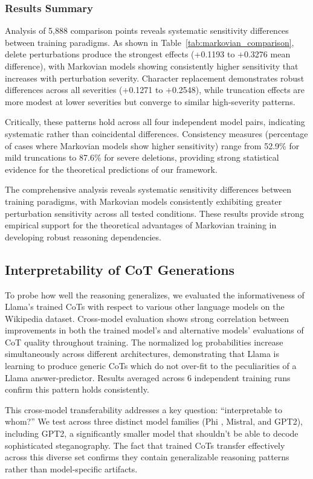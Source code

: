 \documentclass[letterpaper]{article} %
\begin{document}
\subsubsection{Results Summary}
Analysis of 5,888 comparison points reveals systematic sensitivity differences between training paradigms. As shown in Table~\ref{tab:markovian_comparison}, delete perturbations produce the strongest effects (+0.1193 to +0.3276 mean difference), with Markovian models showing consistently higher sensitivity that increases with perturbation severity. Character replacement demonstrates robust differences across all severities (+0.1271 to +0.2548), while truncation effects are more modest at lower severities but converge to similar high-severity patterns.

Critically, these patterns hold across all four independent model pairs, indicating systematic rather than coincidental differences. Consistency measures (percentage of cases where Markovian models show higher sensitivity) range from 52.9\% for mild truncations to 87.6\% for severe deletions, providing strong statistical evidence for the theoretical predictions of our framework.

The comprehensive analysis reveals systematic sensitivity differences between training paradigms, with Markovian models consistently exhibiting greater perturbation sensitivity across all tested conditions. These results provide strong empirical support for the theoretical advantages of Markovian training in developing robust reasoning dependencies.

\subsection{Interpretability of CoT Generations}
\label{subsec:interp}

To probe how well the reasoning generalizes, we evaluated the informativeness of Llama's trained CoTs with respect to various other language models on the Wikipedia dataset. Cross-model evaluation shows strong correlation between improvements in both the trained model's and alternative models' evaluations of CoT quality throughout training. The normalized log probabilities increase simultaneously across different architectures, demonstrating that Llama is learning to produce generic CoTs which do not over-fit to the peculiarities of a Llama answer-predictor. Results averaged across 6 independent training runs confirm this pattern holds consistently. 

This cross-model transferability addresses a key question: ``interpretable to whom?'' We test across three distinct model families (Phi \citep{abdin2024phi3technicalreporthighly}, Mistral, and GPT2), including GPT2, a significantly smaller model that shouldn't be able to decode sophisticated steganography. The fact that trained CoTs transfer effectively across this diverse set confirms they contain generalizable reasoning patterns rather than model-specific artifacts.
\end{document}
